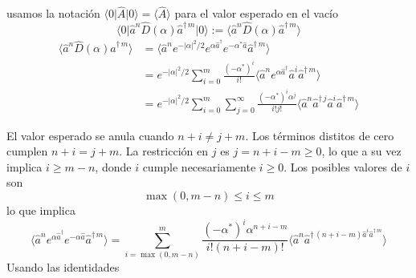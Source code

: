 \begin{enumerate}
        usamos la notación $\langle 0 \vert \hat{A} \vert 0 \rangle = \langle \hat{A} \rangle$ para el valor esperado en el vacío
        \begin{equation*}
          \langle 0 \vert \hat{a}^{n} \hat{D}(\alpha) \hat{a}^{\dagger\,m} \vert 0\rangle := \langle \hat{a}^{n} \hat{D}(\alpha) \hat{a}^{\dagger\,m} \rangle
        \end{equation*}
        \begin{align*}
          \langle \hat{a}^{n} \hat{D}(\alpha) \hat{a}^{\dagger\,m} \rangle & = \langle \hat{a}^{n}  e^{-|\alpha|^2/2} e^{\alpha \hat{a}^{\dagger}}e^{-\alpha^{*}\hat{a}} \hat{a}^{\dagger\,m} \rangle                                                       \\
                                                                           & = e^{-|\alpha|^2/2}\sum_{i=0}^{m} \frac{(-\alpha^*)^{i}}{i!}\langle \hat{a}^{n} e^{\alpha \hat{a}^{\dagger}} \hat{a}^{i} \hat{a}^{\dagger\,m} \rangle                          \\
                                                                           & = e^{-|\alpha|^2/2}\sum_{i=0}^{m} \sum_{j=0}^{\infty} \frac{(-\alpha^*)^{i} \alpha^{j}}{i!j!}\langle \hat{a}^{n} \hat{a}^{\dagger\,j} \hat{a}^{i} \hat{a}^{\dagger\,m} \rangle
        \end{align*}

        El valor esperado se anula cuando $n+i\neq j + m$. Los términos distitos de cero cumplen $n+i = j+m$. La restricción en $j$ es $j=n+i-m\geq0$, lo que a su vez implica $i\geq m-n$, donde $i$ cumple necesariamente $i\geq0$. Los posibles valores de $i$ son
        \begin{equation*}
          \max(0, m-n)\leq i \leq m
        \end{equation*}
        lo que implica
        \begin{equation*}
          \langle \hat{a}^{n} e^{\alpha\hat{a}^{\dagger}} e^{-\alpha \hat{a}} \hat{a}^{\dagger\,m} \rangle = \sum_{i=\max(0, m-n)}^{m}\frac{(-\alpha^{*})^{i}\alpha^{n+i-m}}{i! (n+i-m)!} \langle \hat{a}^{n} \hat{a}^{\dagger\,(n+i-m) \hat{a}^{i} \hat{a}^{\dagger\,m}} \rangle
        \end{equation*}
        Usando las identidades



\end{enumerate}
